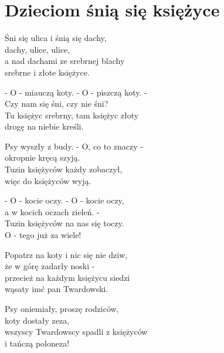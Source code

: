 \documentclass[11pt,a4pape,leqno,twoside]{book}
\begin{document}
\chapter{Dzieciom śnią się księżyce}
Śni się ulica i śnią się dachy,\\
dachy, ulice, ulice,\\
a nad dachami ze srebrnej blachy\\
srebrne i złote księżyce.\\ \vspace{0.1cm}

- O - miauczą koty. - O - piszczą koty. -\\
Czy nam się śni, czy nie śni?\\
Tu księżyc srebrny, tam księżyc złoty\\
drogę na niebie kreśli.\\ \vspace{0.1cm}

Psy wyszły z budy. - O, co to znaczy -\\
okropnie kręcą szyją.\\
Tuzin księżyców każdy zobaczył,\\
więc do księżyców wyją.\\ \vspace{0.1cm}

- O - kocie oczy. - O - kocie oczy,\\
a w kocich oczach zieleń. -\\
Tuzin księżyców na nas się toczy.\\
O - tego już za wiele!\\ \vspace{0.1cm}

Popatrz na koty i nic się nie dziw,\\
że w górę zadarły noski -\\
przecież na każdym księżycu siedzi\\
wąsaty imć pan Twardowski.\\ \vspace{0.1cm}

Psy oniemiały, proszę rodziców,\\
koty dostały zeza,\\
wszyscy Twardowscy spadli z księżyców\\
i tańczą poloneza!\\ \vspace{0.1cm}
\end{document}
